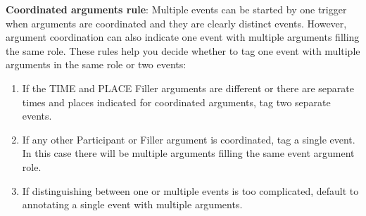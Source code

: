 \textbf{Coordinated arguments rule}:
Multiple events can be started by one trigger when arguments are coordinated and they are clearly distinct events.
However, argument coordination can also indicate one event with multiple arguments filling the same role.
These rules help you decide whether to tag one event with multiple arguments in the same role or two events:
\begin{enumerate}
    \item If the TIME and PLACE Filler arguments are different or there are separate times and places indicated for coordinated arguments, tag two separate events.
    \item If any other Participant or Filler argument is coordinated, tag a single event.
    In this case there will be multiple arguments filling the same event argument role.
    \item If distinguishing between one or multiple events is too complicated, default to annotating a single event with multiple arguments.
\end{enumerate}

